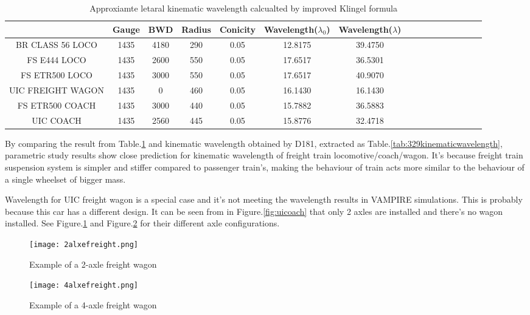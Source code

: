 \begin{table}[h]
  \centering
  \caption{Approxiamte letaral kinematic wavelength calcualted by improved Klingel formula}
    \begin{tabular}{cccccccccccccccc}
    \toprule
    & Gauge & BWD & Radius & Conicity & Wavelength($\lambda_0$) &Wavelength($\lambda$) & \\
    \midrule
    BR CLASS 56 LOCO  & 1435 & 4180 & 290 & 0.05 & 12.8175 & 39.4750 \\
    FS E444 LOCO  & 1435 & 2600 & 550 & 0.05 & 17.6517 & 36.5301 \\
    FS ETR500 LOCO  & 1435 & 3000 & 550 & 0.05 & 17.6517 & 40.9070\\
    UIC FREIGHT WAGON  & 1435 & 0 & 460 & 0.05 & 16.1430 & 16.1430 \\
    FS ETR500 COACH  & 1435 & 3000 & 440 & 0.05 & 15.7882 & 36.5883 & \\
    UIC COACH  & 1435 & 2560 & 445 & 0.05 & 15.8776 & 32.4718 &  \\
    \bottomrule
    \end{tabular}%
  \label{tab:wavelengthkinematic}%
\end{table}%


By comparing the result from Table.\ref{tab:wavelengthkinematic} and kinematic wavelength obtained by D181, extracted as Table.\ref{tab:329kinematicwavelength}, parametric study results show close prediction for kinematic wavelength of freight train locomotive/coach/wagon. It's because freight train suspension system is simpler and stiffer compared to passenger train's, making the behaviour of train acts more similar to the behaviour of a single wheelset of bigger mass. 


Wavelength for UIC freight wagon is a special case and it's not meeting the wavelength results in VAMPIRE simulations. This is probably because this car has a different design. It can be seen from in Figure.\ref{fig:uicoach} that only 2 axles are installed and there's no wagon installed. See Figure.\ref{fig:2axlefreight} and Figure.\ref{fig:4axlefreight} for their different axle configurations.

\begin{figure}[h]
	\centering
	\texttt{[image: 2alxefreight.png]}
	\caption{Example of a 2-axle freight wagon}
	\label{fig:2axlefreight}
\end{figure}

\begin{figure}[h]
	\centering
	\texttt{[image: 4alxefreight.png]}
	\caption{Example of a 4-axle freight wagon}
	\label{fig:4axlefreight}
\end{figure}


